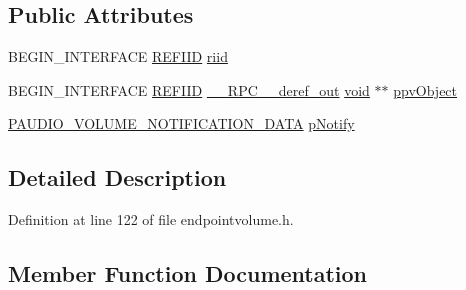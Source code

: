 \subsection*{Public Attributes}
\begin{DoxyCompactItemize}
\item 
B\+E\+G\+I\+N\+\_\+\+I\+N\+T\+E\+R\+F\+A\+CE \hyperlink{px__win__ds_8c_a80ec49c8ae61e234197d5071d2df497d}{R\+E\+F\+I\+ID} \hyperlink{struct_i_audio_endpoint_volume_callback_vtbl_a3f9b26092a79871d7ccc29aa73f0a663}{riid}
\item 
B\+E\+G\+I\+N\+\_\+\+I\+N\+T\+E\+R\+F\+A\+CE \hyperlink{px__win__ds_8c_a80ec49c8ae61e234197d5071d2df497d}{R\+E\+F\+I\+ID} \hyperlink{rpcsal_8h_a23bc188526f10656f9c79d950f6c3192}{\+\_\+\+\_\+\+R\+P\+C\+\_\+\+\_\+deref\+\_\+out} \hyperlink{sound_8c_ae35f5844602719cf66324f4de2a658b3}{void} $\ast$$\ast$ \hyperlink{struct_i_audio_endpoint_volume_callback_vtbl_a1a70677faf66fbdc03ba70bda97651fd}{ppv\+Object}
\item 
\hyperlink{endpointvolume_8h_a9da0e89ae4c16f92d52ef8beec745ead}{P\+A\+U\+D\+I\+O\+\_\+\+V\+O\+L\+U\+M\+E\+\_\+\+N\+O\+T\+I\+F\+I\+C\+A\+T\+I\+O\+N\+\_\+\+D\+A\+TA} \hyperlink{struct_i_audio_endpoint_volume_callback_vtbl_a567ebd605ea096c4fc772ba8149315d8}{p\+Notify}
\end{DoxyCompactItemize}


\subsection{Detailed Description}


Definition at line 122 of file endpointvolume.\+h.



\subsection{Member Function Documentation}
